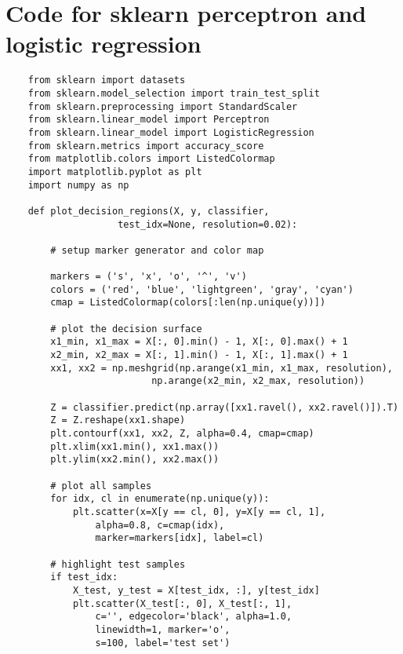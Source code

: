 \documentclass[12pt]{article}
\begin{document}
\section{Code for sklearn perceptron and logistic regression}
\begin{verbatim}
    from sklearn import datasets 
    from sklearn.model_selection import train_test_split
    from sklearn.preprocessing import StandardScaler
    from sklearn.linear_model import Perceptron
    from sklearn.linear_model import LogisticRegression
    from sklearn.metrics import accuracy_score
    from matplotlib.colors import ListedColormap
    import matplotlib.pyplot as plt
    import numpy as np 
    
    def plot_decision_regions(X, y, classifier,                     
                    test_idx=None, resolution=0.02):    
        
        # setup marker generator and color map
    
        markers = ('s', 'x', 'o', '^', 'v')    
        colors = ('red', 'blue', 'lightgreen', 'gray', 'cyan')    
        cmap = ListedColormap(colors[:len(np.unique(y))])    
        
        # plot the decision surface    
        x1_min, x1_max = X[:, 0].min() - 1, X[:, 0].max() + 1    
        x2_min, x2_max = X[:, 1].min() - 1, X[:, 1].max() + 1    
        xx1, xx2 = np.meshgrid(np.arange(x1_min, x1_max, resolution),       
                          np.arange(x2_min, x2_max, resolution))    
                          
        Z = classifier.predict(np.array([xx1.ravel(), xx2.ravel()]).T)    
        Z = Z.reshape(xx1.shape)    
        plt.contourf(xx1, xx2, Z, alpha=0.4, cmap=cmap)    
        plt.xlim(xx1.min(), xx1.max())    
        plt.ylim(xx2.min(), xx2.max())    
        
        # plot all samples    
        for idx, cl in enumerate(np.unique(y)):        
            plt.scatter(x=X[y == cl, 0], y=X[y == cl, 1],                    
                alpha=0.8, c=cmap(idx),                    
                marker=markers[idx], label=cl)
    
        # highlight test samples    
        if test_idx:        
            X_test, y_test = X[test_idx, :], y[test_idx]           
            plt.scatter(X_test[:, 0], X_test[:, 1], 
                c='', edgecolor='black', alpha=1.0, 
                linewidth=1, marker='o',                 
                s=100, label='test set')
    

\end{verbatim}
\end{document}

